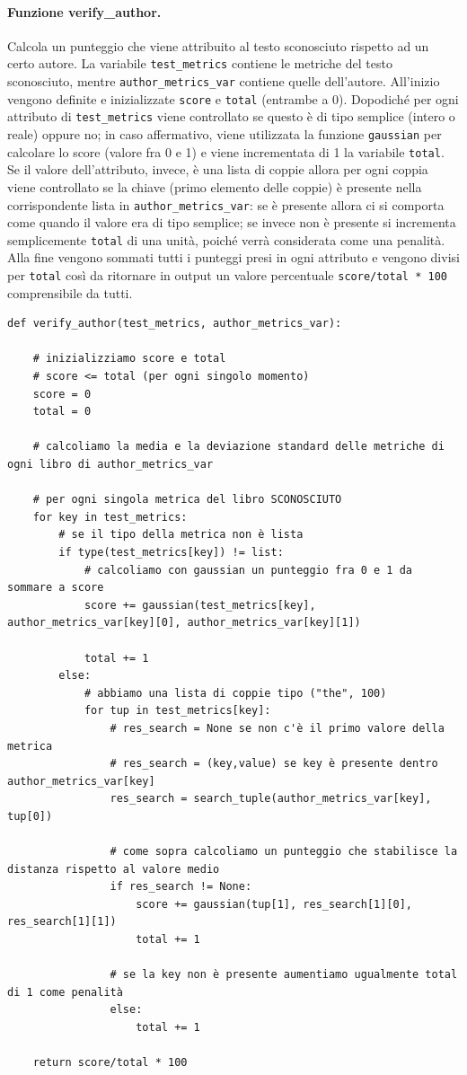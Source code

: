 \documentclass[titlepage]{article}
\begin{document}
\paragraph{Funzione verify\_author.}
Calcola un punteggio che viene attribuito al testo sconosciuto rispetto ad un certo autore. La variabile \texttt{test\_metrics} contiene le metriche del testo sconosciuto, mentre \texttt{author\_metrics\_var} contiene quelle dell'autore. All'inizio vengono definite e inizializzate \texttt{score} e \texttt{total} (entrambe a 0). Dopodiché per ogni attributo di \texttt{test\_metrics} viene controllato se questo è di tipo semplice (intero o reale) oppure no; in caso affermativo, viene utilizzata la funzione \texttt{gaussian} per calcolare lo score (valore fra 0 e 1) e viene incrementata di 1 la variabile \texttt{total}. Se il valore dell'attributo, invece, è una lista di coppie allora per ogni coppia viene controllato se la chiave (primo elemento delle coppie) è presente nella corrispondente lista in \texttt{author\_metrics\_var}: se è presente allora ci si comporta come quando il valore era di tipo semplice; se invece non è presente si incrementa semplicemente \texttt{total} di una unità, poiché verrà considerata come una penalità. Alla fine vengono sommati tutti i punteggi presi in ogni attributo e vengono divisi per \texttt{total} così da ritornare in output un valore percentuale \texttt{score/total * 100} comprensibile da tutti.
\begin{verbatim}
def verify_author(test_metrics, author_metrics_var):
    
    # inizializziamo score e total
    # score <= total (per ogni singolo momento)
    score = 0
    total = 0
    
    # calcoliamo la media e la deviazione standard delle metriche di ogni libro di author_metrics_var
    
    # per ogni singola metrica del libro SCONOSCIUTO
    for key in test_metrics:
        # se il tipo della metrica non è lista
        if type(test_metrics[key]) != list:
            # calcoliamo con gaussian un punteggio fra 0 e 1 da sommare a score
            score += gaussian(test_metrics[key], author_metrics_var[key][0], author_metrics_var[key][1])
            
            total += 1
        else:
            # abbiamo una lista di coppie tipo ("the", 100)
            for tup in test_metrics[key]:
                # res_search = None se non c'è il primo valore della metrica
                # res_search = (key,value) se key è presente dentro author_metrics_var[key]
                res_search = search_tuple(author_metrics_var[key], tup[0])
                
                # come sopra calcoliamo un punteggio che stabilisce la distanza rispetto al valore medio
                if res_search != None:
                    score += gaussian(tup[1], res_search[1][0], res_search[1][1])
                    total += 1
                
                # se la key non è presente aumentiamo ugualmente total di 1 come penalità
                else:
                    total += 1
    
    return score/total * 100
\end{verbatim}
\end{document}
